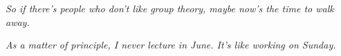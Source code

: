 
\textit{So if there's people who don't like group theory, maybe now's the time
  to walk away.}

\textit{As a matter of principle, I never lecture in June. It's like working on
  Sunday.}


